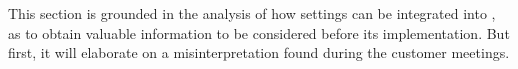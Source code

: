 This section is grounded in the analysis of how settings can be integrated into \launcher, as to obtain valuable information to be considered before its implementation.
But first, it will elaborate on a misinterpretation found during the customer meetings.